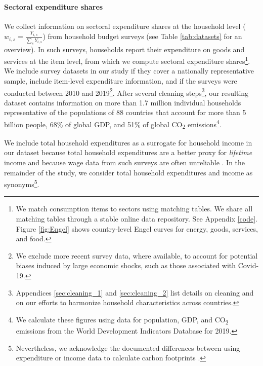 \documentclass[12pt, a4paper]{article}
\begin{document}
\paragraph{Sectoral expenditure shares} We collect information on sectoral expenditure shares at the household level ($w_{i,s}=\frac{Y_{i,s}}{\sum_{s}Y_{i,s}}$) from household budget surveys (see Table \ref{tab:datasets} for an overview). In such surveys, households report their expenditure on goods and services at the item level, from which we compute sectoral expenditure shares\footnote{We match consumption items to sectors using matching tables. We share all matching tables through a stable online data repository. See Appendix \ref{code}. Figure \ref{fig:Engel} shows country-level Engel curves for energy, goods, services, and food.}. We include survey datasets in our study if they cover a nationally representative sample, include item-level expenditure information, and if the surveys were conducted between 2010 and 2019\footnote{We exclude more recent survey data, where available, to account for potential biases induced by large economic shocks, such as those associated with Covid-19.}. After several cleaning steps\footnote{Appendices \ref{sec:cleaning_1} and \ref{sec:cleaning_2} list details on cleaning and on our efforts to harmonize household characteristics across countries.}, our resulting dataset contains information on more than 1.7 million individual households representative of the populations of 88 countries that account for more than 5 billion people, 68\% of global GDP, and 51\% of global CO\textsubscript{2} emissions\footnote{We calculate these figures using data for population, GDP, and CO\textsubscript{2} emissions from the World Development Indicators Database \autocite{WorldBankGroup.2023} for 2019.}.

We include total household expenditures as a surrogate for household income in our dataset because total household expenditures are a better proxy for \textit{lifetime} income \autocite{Poterba.1989,Poterba.1991,Cronin.2019} and because wage data from such surveys are often unreliable \autocite{Blundell.1998}. In the remainder of the study, we consider total household expenditures and income as synonyms\footnote{Nevertheless, we acknowledge the documented differences between using expenditure or income data to calculate carbon footprints \autocite[see][]{Levay.2023}.}.
\end{document}
